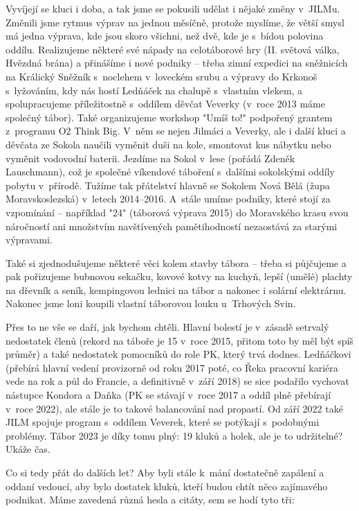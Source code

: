 \documentclass[a5paper, 11pt, twoside]{article}
\begin{document}
Vyvíjejí se kluci i doba, a tak jsme se pokusili udělat i nějaké změny
v~JILMu. Změnili jsme rytmus výprav na jednou měsíčně, protože myslíme, že
větší smysl má jedna výprava, kde jsou skoro všichni, než dvě, kde je
s~bídou polovina oddílu. Realizujeme některé své nápady na celotáborové
hry (II. světová válka, Hvězdná brána) a přinášíme i nové podniky --
třeba zimní expedici na sněžnicích na Králický Sněžník s~noclehem
v~loveckém srubu a výpravy do Krkonoš s~lyžováním, kdy nás hostí Ledňáček
na chalupě s~vlastním vlekem, a spolupracujeme příležitostně s~oddílem
děvčat Veverky (v~roce 2013 máme společný tábor). Také organizujeme
workshop "Umíš to!" podpořený grantem z~programu O2 Think Big. V~něm
se nejen Jilmáci a Veverky, ale i další kluci a děvčata ze Sokola
naučili vyměnit duši na kole, smontovat kus nábytku nebo vyměnit
vodovodní baterii. Jezdíme na Sokol v~lese (pořádá Zdeněk Lauschmann),
což je společné víkendové táboření s~dalšími sokolskými oddíly pobytu
v~přírodě. Tužíme tak přátelství hlavně se Sokolem Nová Bělá (župa
Moravskoslezská) v~letech 2014--2016. A~stále umíme podniky, které stojí
za vzpomínání -- například "24" (táborová výprava 2015) do Moravského
krasu svou náročností ani množstvím navštívených pamětihodností
nezaostává za starými výpravami.

Také si zjednodušujeme některé věci kolem stavby tábora -- třeba si
půjčujeme a pak pořizujeme bubnovou sekačku, kovové kotvy na kuchyň,
lepší (umělé) plachty na dřevník a seník, kempingovou lednici na tábor a
nakonec i solární elektrárnu. Nakonec jsme loni koupili vlastní
táborovou louku u~Trhových Svin.

Přes to ne vše se daří, jak bychom chtěli. Hlavní bolestí je v~zásadě
setrvalý nedostatek členů (rekord na táboře je 15 v~roce 2015, přitom
toto by měl být spíš průměr) a také nedostatek pomocníků do role PK,
který trvá dodnes. Ledňáčkovi (přebírá hlavní vedení provizorně od roku
2017 poté, co Řeka pracovní kariéra vede na rok a půl do Francie, a
definitivně v~září 2018) se sice podařilo vychovat nástupce Kondora a
Daňka (PK se stávají v~roce 2017 a oddíl plně přebírají v~roce 2022),
ale stále je to takové balancování nad propastí. Od září 2022 také JILM
spojuje program s~oddílem Veverek, které se potýkají s~podobnými
problémy. Tábor 2023 je díky tomu plný: 19 kluků a holek, ale je to
udržitelné? Ukáže čas.

Co si tedy přát do dalších let? Aby byli stále k~mání dostatečně
zapálení a oddaní vedoucí, aby bylo dostatek kluků, kteří budou chtít
něco zajímavého podnikat. Máme zavedená různá hesla a citáty, sem se
hodí tyto tři:
\end{document}
